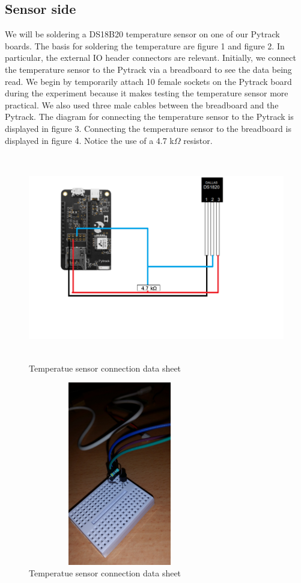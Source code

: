 	\subsection{Sensor side}
		We will be soldering a DS18B20 temperature sensor on one of our Pytrack boards. The basis for soldering the temperature are figure 1 and figure 2. In particular, the external IO header connectors are relevant. Initially, we connect the temperature sensor to the Pytrack via a breadboard to see the data being read. We begin by temporarily attach 10 female sockets on the Pytrack board during the experiment because it makes testing the temperature sensor more practical. We also used three male cables between the breadboard and the Pytrack. The diagram for connecting the temperature sensor to the Pytrack is displayed in figure 3. Connecting the temperature sensor to the breadboard is displayed in figure 4. Notice the use of a 4.7 k$\Omega$ resistor.
		\begin{figure}[h]
			\caption{Temperatue sensor connection data sheet}
			\includegraphics[width=15cm, height=9cm]{pytracktempchart}
		\end{figure}
		\begin{figure}[h]
			\caption{Temperatue sensor connection data sheet}
			\includegraphics[width=8cm, height=8cm]{breadboard1}
		\end{figure}
